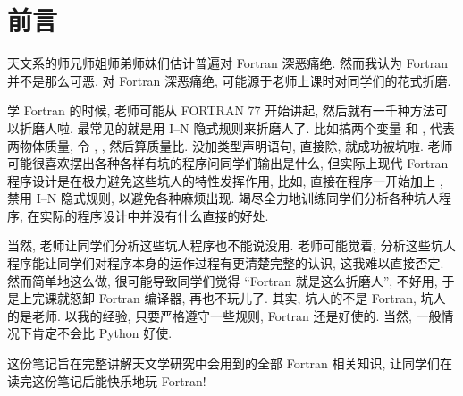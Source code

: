 \chapter*{前言}

天文系的师兄师姐师弟师妹们估计普遍对 Fortran 深恶痛绝. 然而我认为 Fortran 并不是那么可恶. 对 Fortran 深恶痛绝, 可能源于老师上课时对同学们的花式折磨.

学 Fortran 的时候, 老师可能从 FORTRAN 77 开始讲起, 然后就有一千种方法可以折磨人啦. 最常见的就是用 I--N 隐式规则来折磨人了. 比如搞两个变量  和 , 代表两物体质量, 令 , , 然后算质量比. 没加类型声明语句, 直接除, 就成功被坑啦. 老师可能很喜欢摆出各种各样有坑的程序问同学们输出是什么, 但实际上现代 Fortran 程序设计是在极力避免这些坑人的特性发挥作用, 比如, 直接在程序一开始加上 , 禁用 I--N 隐式规则, 以避免各种麻烦出现. 竭尽全力地训练同学们分析各种坑人程序, 在实际的程序设计中并没有什么直接的好处.

当然, 老师让同学们分析这些坑人程序也不能说没用. 老师可能觉着, 分析这些坑人程序能让同学们对程序本身的运作过程有更清楚完整的认识, 这我难以直接否定. 然而简单地这么做, 很可能导致同学们觉得 ``Fortran 就是这么折磨人'', 不好用, 于是上完课就怒卸 Fortran 编译器, 再也不玩儿了. 其实, 坑人的不是 Fortran, 坑人的是老师. 以我的经验, 只要严格遵守一些规则, Fortran 还是好使的. 当然, 一般情况下肯定不会比 Python 好使.

这份笔记旨在完整讲解天文学研究中会用到的全部 Fortran 相关知识, 让同学们在读完这份笔记后能快乐地玩 Fortran!
